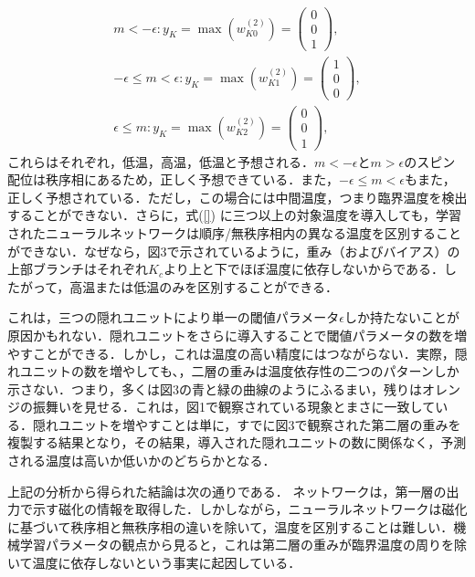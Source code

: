 \documentclass[a4paper,11pt]{jsreport}
\begin{document}
\begin{align}
  m<-\epsilon : y_K = \max(w_{K0}^{(2)}) =
  \begin{pmatrix}
    0 \\ 0 \\ 1
  \end{pmatrix}, \\
  -\epsilon \leq m < \epsilon : y_K = \max(w_{K1}^{(2)}) =
  \begin{pmatrix}
    1 \\ 0 \\ 0
  \end{pmatrix}, \\
  \epsilon \leq m : y_K = \max(w_{K2}^{(2)}) =
  \begin{pmatrix}
    0 \\ 0 \\ 1
  \end{pmatrix},
\end{align}
これらはそれぞれ，低温，高温，低温と予想される．$m<-\epsilon$と$m>\epsilon$のスピン配位は秩序相にあるため，正しく予想できている．また，$-\epsilon \leq m < \epsilon$もまた，正しく予想されている．ただし，この場合には中間温度，つまり臨界温度を検出することができない．さらに，式(\ref{}) に三つ以上の対象温度を導入しても，学習されたニューラルネットワークは順序/無秩序相内の異なる温度を区別することができない．なぜなら，図3で示されているように，重み（およびバイアス）の上部ブランチはそれぞれ$K_c$より上と下でほぼ温度に依存しないからである．したがって，高温または低温のみを区別することができる．\par
これは，三つの隠れユニットにより単一の閾値パラメータ$\epsilon$しか持たないことが原因かもれない．隠れユニットをさらに導入することで閾値パラメータの数を増やすことができる．しかし，これは温度の高い精度にはつながらない．実際，隠れユニットの数を増やしても、，二層の重みは温度依存性の二つのパターンしか示さない．つまり，多くは図3の青と緑の曲線のようにふるまい，残りはオレンジの振舞いを見せる．これは，図1で観察されている現象とまさに一致している．隠れユニットを増やすことは単に，すでに図3で観察された第二層の重みを複製する結果となり，その結果，導入された隠れユニットの数に関係なく，予測される温度は高いか低いかのどちらかとなる．\par
上記の分析から得られた結論は次の通りである．
ネットワークは，第一層の出力で示す磁化の情報を取得した．しかしながら，ニューラルネットワークは磁化に基づいて秩序相と無秩序相の違いを除いて，温度を区別することは難しい．機械学習パラメータの観点から見ると，これは第二層の重みが臨界温度の周りを除いて温度に依存しないという事実に起因している．
\end{document}
